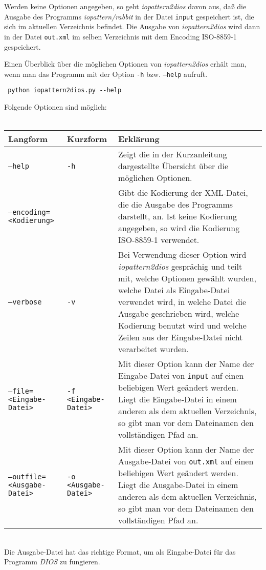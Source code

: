 \documentclass{scrartcl}
\begin{document}
Werden keine Optionen angegeben, so geht \emph{iopattern2dios} davon aus,
daß die Ausgabe des Programms \emph{iopattern/rabbit} in der Datei 
\texttt{input} gespeichert ist, die sich im aktuellen Verzeichnis 
befindet. Die Ausgabe von \emph{iopattern2dios} wird dann in der 
Datei \texttt{out.xml} im selben Verzeichnis mit dem Encoding ISO-8859-1 
gespeichert.

Einen Überblick über die möglichen Optionen von \emph{iopattern2dios} erhält
man, wenn man das Programm mit der Option \texttt{-h} bzw. \texttt{--help}
aufruft.
\begin{verbatim}
 python iopattern2dios.py --help
\end{verbatim}
Folgende Optionen sind möglich:\\~\\
\renewcommand{\arraystretch}{1.5}
\begin{longtable}{|l|l|p{}|}
\hline
\textbf{Langform} & \textbf{Kurzform} & \textbf{Erklärung}\\
\hline
\texttt{--help} & \texttt{-h} & Zeigt die in der Kurzanleitung dargestellte
				Übersicht über die möglichen Optionen. \\
\texttt{--encoding=<Kodierung>} &  & Gibt die Kodierung der XML-Datei, die
				die Ausgabe des Programms darstellt, an. 
				Ist keine Kodierung angegeben, so wird die 
				Kodierung ISO-8859-1 verwendet.\\
\texttt{--verbose} & \texttt{-v} & Bei Verwendung dieser Option wird 
				\emph{iopattern2dios} gesprächig und teilt mit,
				welche Optionen gewählt wurden, welche Datei 
				als Eingabe-Datei verwendet wird, in welche 
				Datei die Ausgabe geschrieben wird, welche 
				Kodierung benutzt wird und welche 
				Zeilen aus der Eingabe-Datei nicht verarbeitet
				wurden.\\
\texttt{--file=<Eingabe-Datei>} & \texttt{-f <Eingabe-Datei>} & Mit dieser 
				Option kann der Name der Eingabe-Datei von 
				\texttt{input} auf einen beliebigen Wert
				geändert werden. Liegt die Eingabe-Datei in 
				einem anderen als dem aktuellen Verzeichnis,
				so gibt man vor dem Dateinamen den 
				vollständigen Pfad an.\\
\texttt{--outfile=<Ausgabe-Datei>} & \texttt{-o <Ausgabe-Datei>} & Mit dieser 
				Option kann der Name der Ausgabe-Datei von 
				\texttt{out.xml} auf einen beliebigen Wert 
				geändert werden. Liegt die Ausgabe-Datei in 
				einem anderen als dem aktuellen Verzeichnis,
				so gibt man vor dem Dateinamen den 
				vollständigen Pfad an.\\
\hline
\end{longtable}
~\\
Die Ausgabe-Datei hat das richtige Format, um als Eingabe-Datei für das 
Programm \emph{DIOS} zu fungieren.
\end{document}
